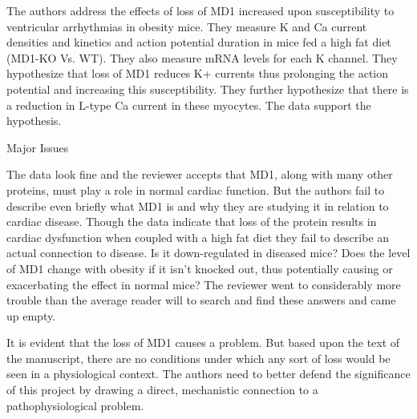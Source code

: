 \documentclass[11pt]{article}
\begin{document}
The authors address the effects of loss of MD1 increased upon susceptibility to ventricular arrhythmias in obesity mice.  They measure K and Ca current densities and kinetics and action potential duration in mice fed a high fat diet (MD1-KO Vs. WT).  They also measure mRNA levels for each K channel. They hypothesize that loss of MD1 reduces K+ currents thus prolonging the action potential and increasing this susceptibility.  They further hypothesize that there is a reduction in L-type Ca current in these myocytes.  The data support the hypothesis.

Major Issues

The data look fine and the reviewer accepts that MD1, along with many other proteins, must play a role in normal cardiac function.  But the authors fail to describe even briefly what MD1 is and why they are studying it in relation to cardiac disease.  Though the data indicate that loss of the protein results in cardiac dysfunction when coupled with a high fat diet they fail to describe an actual connection to disease.  Is it down-regulated in diseased mice?  Does the level of MD1 change with obesity if it isn't knocked out, thus potentially causing or exacerbating the effect in normal mice?  The reviewer went to considerably more trouble than the average reader will to search and find these answers and came up empty.

It is evident that the loss of MD1 causes a problem.  But based upon the text of the manuscript, there are no conditions under which any sort of loss would be seen in a physiological context.  The authors need to better defend the significance of this project by drawing a direct, mechanistic connection to a pathophysiological problem.
\end{document}
